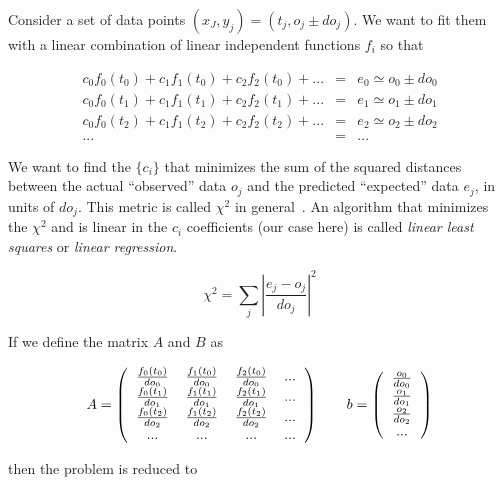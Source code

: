 \documentclass[justified, sixbynine]{tufte-book}
\theoremstyle{plain}%
\newtheorem * {corollary}{Corollary}
\theoremstyle{definition}
\theoremstyle{remark}
\newtheorem * {remark}{Remark}
\newtheorem * {note}{Note}
\begin{document}
\begin{fullwidth}

Consider a set of data points $(x_J, y_j) = (t_j, o_j \pm do_j)$. We want to fit them with a linear combination of linear independent functions $f_i$ so that

\begin{eqnarray}
c_0 f_0(t_0) + c_1 f_1(t_0) + c_2 f_2(t_0) +  ... & = & e_0 \simeq o_0 \pm do_0\\
c_0 f_0(t_1) + c_1 f_1(t_1) + c_2 f_2(t_1) +  ... & = & e_1 \simeq o_1 \pm do_1\\
c_0 f_0(t_2) + c_1 f_1(t_2) + c_2 f_2(t_2) +  ... & = & e_2 \simeq o_2 \pm do_2\\
... &=& ...
\end{eqnarray}

We want to find the $\{c_i\}$ that minimizes the sum of the squared distances between the actual ``observed'' data $o_j$ and the predicted ``expected'' data $e_j$, in units of $do_j$. This metric is called $\chi^2$ in general~\cite{chi2}. An algorithm that minimizes the $\chi^2$  and is linear in the $c_i$ coefficients (our case here) is called {\it linear least squares} or {\it linear regression}.

\begin{equation}
\chi^2 = \sum_j \left|\frac{e_j - o_j}{do_j}\right|^2
\end{equation}

If we define the matrix $A$ and $B$ as

\begin{equation}
A=\left(
\begin{tabular}{cccc}
$\frac{f_0(t_0)}{do_0}$ & $\frac{f_1(t_0)}{do_0}$ & $\frac{f_2(t_0)}{do_0}$ &...\\
$\frac{f_0(t_1)}{do_1}$ & $\frac{f_1(t_1)}{do_1}$ & $\frac{f_2(t_1)}{do_1}$ &...\\
$\frac{f_0(t_2)}{do_2}$ & $\frac{f_1(t_2)}{do_2}$ & $\frac{f_2(t_2)}{do_2}$ &...\\
...& ...& ... & ...
\end{tabular}
\right) \qquad b =
\left(
\begin{tabular}{c}
$\frac{o_0}{do_0}$ \\
$\frac{o_1}{do_1}$ \\
$\frac{o_2}{do_2}$ \\
...
\end{tabular}
\right)
\end{equation}

then the problem is reduced to


\end{fullwidth}
\end{document}
